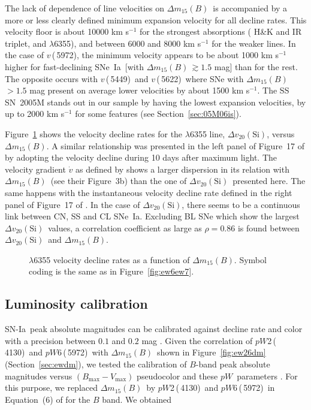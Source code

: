 \documentclass[apj]{emulateapj-rtx4}
\newcommand{\ew}{$pW$}
\newcommand{\pwtwo}{$pW$2\,(\ion{Si}{2}\,4130)}
\newcommand{\pwsix}{$pW$6\,(\ion{Si}{2}\,5972)}
\newcommand{\vthree}{$v$\,(\ion{S}{2}\,5449)}
\newcommand{\vfour}{$v$\,(\ion{S}{2}\,5622)}
\newcommand{\vfive}{$v$\,(\ion{Si}{2}\,5972)}
\newcommand{\dm}{$\Delta m_{15}(B)$}
\newcommand{\deltav}{$\Delta v_{20}(\mathrm{Si})$}
\newcommand{\sndia}{SN-Ia}
\newcommand{\sneia}{SNe~Ia}
\begin{document}
The lack of dependence of line velocities on \dm\ is accompanied by a
more or less clearly defined minimum expansion velocity for all
decline rates. This velocity floor is about 10000 km s$^{-1}$ for the
strongest absorptions ( H\&K and IR triplet, and
 $\lambda$6355), and between 6000 and 8000 km s$^{-1}$ for the
weaker lines. In the case of \vfive, the minimum velocity appears to
be about 1000 km s$^{-1}$ higher for fast-declining \sneia\ [with
  \dm\,$\gtrsim 1.5$ mag] than for the rest. The opposite occurs with
\vthree\ and \vfour\, where SNe with \dm\,$>1.5$ mag present on
average lower velocities by about 1500 km
s$^{-1}$\citep[cf.][]{hachinger06,blondin06}. The SS SN~2005M 
stands out in our sample by having the lowest expansion velocities,
by up to 2000 km s$^{-1}$ for some features (see
Section~\ref{sec:05M06is}). 

Figure~\ref{fig:dvdm} shows the velocity decline rates for the
 $\lambda$6355 line, \deltav, versus
\dm. A similar relationship was presented in the left panel of Figure~17 of
\citet{blondin12} by adopting the velocity decline during 10 days after
maximum light. The velocity gradient $\dot{v}$ as defined by
\citet{benetti05} shows a larger dispersion in its relation with
\dm\ (see their Figure~3b) than the one of \deltav\ presented here. The
same happens with the instantaneous velocity decline 
rate defined in the right panel of Figure~17 of \citet{blondin12}. 
In the case of \deltav, there seems to be a continuous link
between CN, SS and CL \sneia. Excluding BL SNe which show the largest
\deltav\ values, a correlation coefficient as large as $\rho=0.86$ is
found between \deltav\ and \dm.

\begin{figure}[htpb]%
\caption{ $\lambda$6355 velocity decline rates as a
  function of \dm. Symbol coding is the same as in
  Figure~\ref{fig:ew6ew7}.\label{fig:dvdm}} 
\end{figure}

\subsection{Luminosity calibration}
\label{sec:Lum}

\sndia\ peak absolute magnitudes can be calibrated against decline
rate and color \citep{tripp98} with a precision between $0.1$ and
$0.2$ mag \citep{hicken09,folatelli10}. Given the correlation of
\pwtwo\ and \pwsix\ with \dm\ shown in Figure~\ref{fig:ew26dm}
(Section~\ref{sec:ewdm}), we tested the calibration of $B$-band peak
absolute magnitudes versus $(B_{\mathrm{max}}-V_{\mathrm{max}})$ pseudocolor and
these \ew\ parameters \citep[similar analysis can be found
  in][]{blondin11a,silverman12c}. For this purpose, we replaced
\dm\ by \pwtwo\ and \pwsix\ in Equation~(6) of
\citet{folatelli10} for the $B$ band. We obtained
\end{document}

